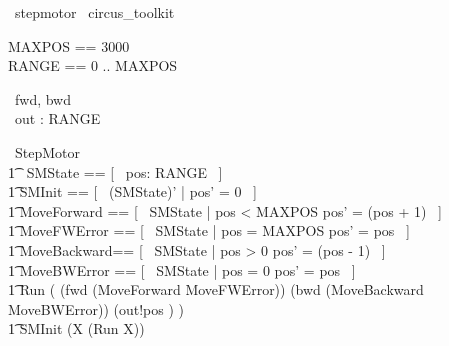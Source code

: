 \documentclass{article}
\begin{document}
\begin{zsection}
	\SECTION\ stepmotor \parents\ circus\_toolkit
\end{zsection}

\begin{zed}
	MAXPOS == 3000  \\
	RANGE == 0 .. MAXPOS 
\end{zed}

\begin{circus}
	\circchannel\ fwd, bwd\\
	\circchannel\ out : RANGE
\end{circus}

\begin{circus}
	\circprocess\ StepMotor \circdef \circbegin \\
    	\t1 \circstate\ SMState == [~ pos: RANGE ~] \\
    	\t1	SMInit == [~ (SMState)' | pos' = 0 ~] \\
		\t1 MoveForward == [~ \Delta SMState | pos < MAXPOS \land pos' = (pos + 1) ~] \\
		\t1 MoveFWError == [~ \Delta SMState | pos = MAXPOS \land pos' = pos ~] \\
		\t1 MoveBackward== [~ \Delta SMState | pos > 0 \land pos' = (pos - 1) ~] \\
		\t1 MoveBWError == [~ \Delta SMState | pos = 0 \land pos' = pos ~] \\
		\t1 Run \circdef (
			(fwd \then  (MoveForward \extchoice MoveFWError))
			\extchoice
			(bwd \then  (MoveBackward \extchoice MoveBWError))
			\extchoice 
			(out!pos \then \Skip)
		) \\
	\t1 \circspot SMInit \circseq (\circmu X \circspot (Run \circseq X)) \\
	\circend
\end{circus}
\end{document}
